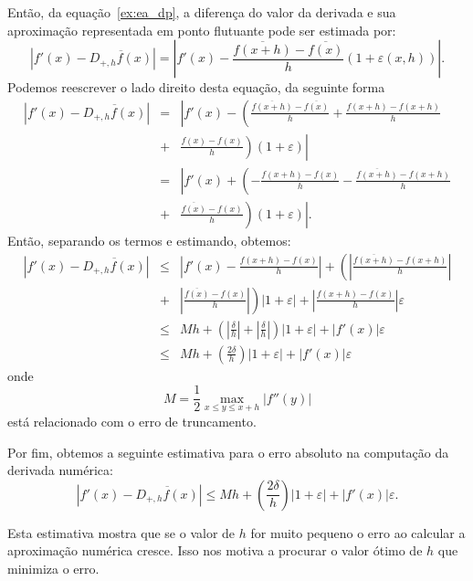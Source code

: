 Então, da equação~\eqref{ex:ea_dp}, a diferença do valor da derivada e sua aproximação representada em ponto flutuante pode ser estimada por:
\begin{equation*}
\left|f'(x)-\overline{D_{+,h}f(x)}\right| = \left| f'(x)-\frac{\overline{f(x+h)}-\overline{f(x)}}{h}(1+\varepsilon(x,h)) \right|.
\end{equation*}
Podemos reescrever o lado direito desta equação, da seguinte forma
\begin{eqnarray*}
  \left|f'(x)-\overline{D_{+,h}f(x)}\right| &=& \left| f'(x)-\left(\frac{\overline{f(x+h)}-\overline{f(x)}}{h}+\frac{f(x+h)-f(x+h)}{h}\right.\right. \\
&+& \left.\left.\frac{f(x)-f(x)}{h}\right)(1+\varepsilon) \right|\\
&=& \left| f'(x)+\left(-\frac{f(x+h)-f(x)}{h}-\frac{\overline{f(x+h)}-f(x+h)}{h}\right.\right.\\
&+& \left.\left. \frac{\overline{f(x)}-f(x)}{h}\right)(1+\varepsilon) \right|.
\end{eqnarray*}
Então, separando os termos e estimando, obtemos:
\begin{eqnarray*}
\left|f'(x)-\overline{D_{+,h}f(x)}\right| &\leq& \left|f'(x)-\frac{f(x+h)-f(x)}{h}\right| +\left(\left|\frac{\overline{f(x+h)}-f(x+h)}{h}\right|\right.\\
&+&\left.\left|\frac{\overline{f(x)}-f(x)}{h}\right| \right)|1+\varepsilon| + \left|\frac{f(x+h)-f(x)}{h}\right|\varepsilon\\
&\leq& Mh +\left(\left|\frac{\delta}{h}\right|+\left|\frac{\delta}{h}\right| \right)|1+\varepsilon| +|f'(x)|\varepsilon\\
&\leq& Mh +\left(\frac{2\delta}{h}\right)|1+\varepsilon| +|f'(x)|\varepsilon
\end{eqnarray*}
onde
$$
M=\frac{1}{2}\max_{x\leq y\leq x+h}|f''(y)|
$$
está relacionado com o erro de truncamento.

Por fim, obtemos a seguinte estimativa para o erro absoluto na computação da derivada numérica:
\begin{equation}\label{eq:est_erro_arredondamento}
  \left|f'(x)-\overline{D_{+,h}f(x)}\right| \leq Mh +\left(\frac{2\delta}{h}\right)|1+\varepsilon| +|f'(x)|\varepsilon.
\end{equation}

Esta estimativa mostra que se o valor de $h$ for muito pequeno o erro ao calcular a aproximação numérica cresce. Isso nos motiva a procurar o valor ótimo de $h$ que minimiza o erro.

